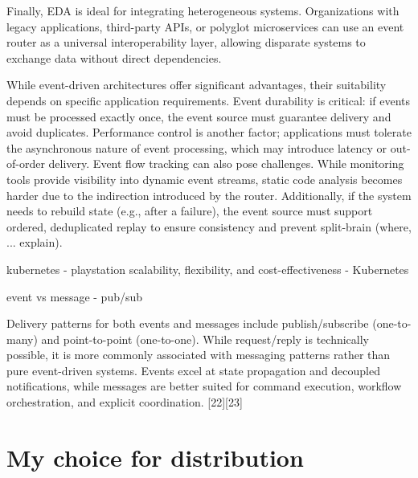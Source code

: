 \documentclass[]{final}
\begin{document}
Finally, EDA is ideal for integrating heterogeneous systems. Organizations with
legacy applications, third-party APIs, or polyglot microservices can use an
event router as a universal interoperability layer, allowing disparate
systems to exchange data without direct dependencies.

While event-driven architectures offer significant advantages, their suitability
depends on specific application requirements. Event durability is critical:
if events must be processed exactly once, the event source must guarantee
delivery and avoid duplicates. Performance control is another factor;
applications must tolerate the asynchronous nature of event processing, which
may introduce latency or out-of-order delivery. Event flow tracking can also
pose challenges. While monitoring tools provide visibility into dynamic event
streams, static code analysis becomes harder due to the indirection
introduced by the router. Additionally, if the system needs to rebuild
state (e.g., after a failure), the event source must support ordered,
deduplicated replay to ensure consistency and prevent split-brain
(where, ... explain).

kubernetes - playstation
scalability, flexibility, and cost-effectiveness - Kubernetes


event vs message - pub/sub

Delivery patterns for both events and messages include publish/subscribe
(one-to-many) and point-to-point (one-to-one). While request/reply is
technically possible, it is more commonly associated with messaging patterns
rather than pure event-driven systems. Events excel at state propagation
and decoupled notifications, while messages are better suited for command
execution, workflow orchestration, and explicit coordination. [22][23]

\section{My choice for distribution}
\end{document}

